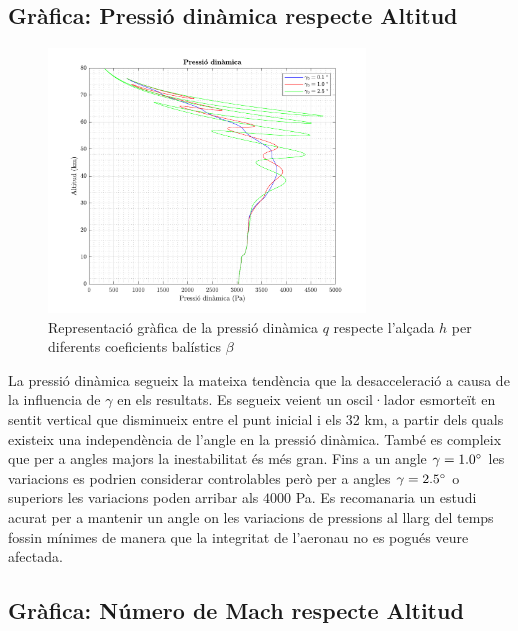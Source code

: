 \newpage
\subsection{Gràfica: Pressió dinàmica respecte Altitud}

\begin{figure}[ht]
    \centering
    \includegraphics[width=0.75\textwidth]{imagenes/02_lifting_graficas/pressio_Dinamica.pdf}
    \caption{Representació gràfica de la pressió dinàmica $q$ respecte l'alçada $h$ per diferents coeficients balístics $\beta$}
    \label{fig:pressio_dinamica_lift}
\end{figure}

La pressió dinàmica segueix la mateixa tendència que la desacceleració a causa de la influencia de $\gamma$ en els resultats. Es segueix veient un oscil·lador esmorteït en sentit vertical que disminueix entre el punt inicial i els 32 km, a partir dels quals existeix una independència de l'angle en la pressió dinàmica. També es compleix que per a angles majors la inestabilitat és més gran. \newline
Fins a un angle $\gamma = 1.0 \mathrm{^{\circ}}$ les variacions es podrien considerar controlables però per a angles $\gamma = 2.5 \mathrm{^{\circ}}$ o superiors les variacions poden arribar als $4000$ Pa.
\newline Es recomanaria un estudi acurat per a mantenir un angle on les variacions de pressions al llarg del temps fossin mínimes de manera que la integritat de l'aeronau no es pogués veure afectada.

\newpage
\subsection{Gràfica: Número de Mach respecte Altitud}

